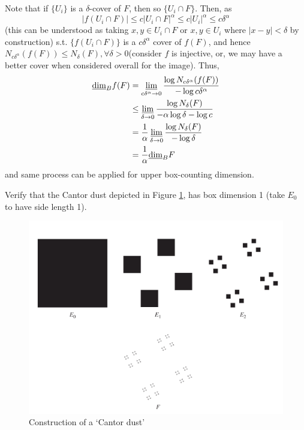 \begin{customsol}{2.2}
    Note that if $\{U_i\}$ is a $\delta$-cover of $F$, then so $\{U_i\cap F\}$. Then, as
    $$
    |f(U_i\cap F)|\leq c|U_i\cap F|^\alpha\leq c|U_i|^\alpha\leq c\delta^\alpha
    $$
    (this can be understood as taking $x, y\in U_i\cap F$ or $x, y\in U_i$ where $|x-y|<\delta$ by construction)
    s.t. $\{f(U_i\cap F)\}$ is a $c\delta^\alpha$ cover of $f(F)$, and hence $N_{c\delta^\alpha}(f(F)) \leq N_\delta(F), \forall \delta>0$(consider $f$ is injective, or, we may have a better cover when considered overall for the image). Thus,
    $$
    \begin{aligned} \underline{\operatorname{dim}}_{B} f(F) &=\varliminf_{c \delta^{\alpha} \rightarrow 0} \frac{\log N_{c \delta^{\alpha}}(f(F))}{-\log c \delta^{\alpha}} \\
        &\leq \varliminf_{\delta \rightarrow 0} \frac{\log N_{\delta}(F)}{-\alpha \log \delta-\log c} \\ &=\frac{1}{\alpha} \varliminf_{\delta \rightarrow 0} \frac{\log N_{\delta}(F)}{-\log \delta}\\
        &=\frac{1}{\alpha} \underline{\operatorname{dim}}_{B} F \end{aligned}
    $$
    and same process can be applied for upper box-counting dimension. 
\end{customsol}


\begin{customexercise}{2.4}\label{calculation}
    Verify that the Cantor dust depicted in Figure \ref{fig:cantordust}, has box dimension 1 (take $E_{0}$ to have side length 1).
    \begin{figure}[H]
        \centering
        \includegraphics[width=.66\textwidth]{images/cantordust.png}
        \caption{ Construction of a ‘Cantor dust’ }
        \label{fig:cantordust}
    \end{figure}
\end{customexercise}

